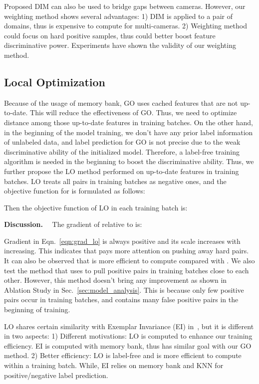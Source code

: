 \documentclass[sigconf]{acmart}
\begin{document}
Proposed DIM can also be used to bridge gaps between cameras. However, our weighting method shows several advantages: 1) DIM is applied to a pair of domains, thus is expensive to compute for multi-cameras. 2) Weighting method could focus on hard positive samples, thus could better boost feature discriminative power. Experiments have shown the validity of our weighting method.


\subsection{Local Optimization}
\label{sec:lo}
Because of the usage of memory bank, GO uses cached features that are not up-to-date. This will reduce the effectiveness of GO. Thus, we need to optimize distance among those up-to-date features in training batches. On the other hand, in the beginning of the model training, we don't have any prior label information of unlabeled data, and label prediction for GO is not precise due to the weak discriminative ability of the initialized model. Therefore, a label-free training algorithm is needed in the beginning to boost the discriminative ability. Thus, we further propose the LO method performed on up-to-date features in training batches. LO treats all pairs in training batches as negative ones, and the objective function for  is formulated as follows:

Then the objective function of LO in each training batch is:


\textbf{Discussion.} \ \
The gradient of  relative to  is:

Gradient in Eqn.~\eqref{eqn:grad_lo} is always positive and its scale increases with  increasing. This indicates that  pays more attention on pushing away hard pairs.  It can also be observed that  is more efficient to compute compared with . We also test the method that uses  to pull positive pairs in training batches close to each other. However, this method doesn't bring any improvement as shown in Ablation Study in Sec.~\ref{sec:model_analysis}. 
This is because only few positive pairs occur in training batches, and  contains many false positive pairs in the beginning of training.

LO shares certain similarity with Exemplar Invariance (EI) in~\cite{zhong2019invariance}, but it is different in two aspects: 1) Different motivations: LO is computed to enhance our training efficiency. EI is computed with memory bank, thus has similar goal with our GO method. 2) Better efficiency: LO is label-free and is more efficient to compute within a training batch. While, EI relies on memory bank and KNN for positive/negative label prediction. 
\end{document}
